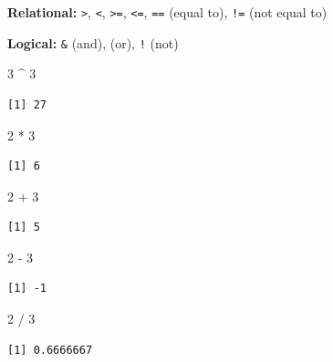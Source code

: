 \documentclass[
  letterpaper,
  DIV=11,
  numbers=noendperiod]{scrartcl}
\newenvironment{Shaded}{\begin{snugshade}}{\end{snugshade}}
\newcommand{\DecValTok}[1]{\textcolor[rgb]{0.68,0.00,0.00}{#1}}
\newcommand{\SpecialCharTok}[1]{\textcolor[rgb]{0.37,0.37,0.37}{#1}}
\begin{document}
\textbf{Relational:} \texttt{\textgreater{}}, \texttt{\textless{}},
\texttt{\textgreater{}=}, \texttt{\textless{}=}, \texttt{==} (equal to),
\texttt{!=} (not equal to)

\textbf{Logical:} \texttt{\&} (and), \texttt{\textbar{}} (or),
\texttt{!} (not)

\begin{Shaded}
\begin{Highlighting}[]
\DecValTok{3} \SpecialCharTok{\^{}} \DecValTok{3}
\end{Highlighting}
\end{Shaded}

\begin{verbatim}
[1] 27
\end{verbatim}

\begin{Shaded}
\begin{Highlighting}[]
\DecValTok{2} \SpecialCharTok{*} \DecValTok{3}
\end{Highlighting}
\end{Shaded}

\begin{verbatim}
[1] 6
\end{verbatim}

\begin{Shaded}
\begin{Highlighting}[]
\DecValTok{2} \SpecialCharTok{+} \DecValTok{3}
\end{Highlighting}
\end{Shaded}

\begin{verbatim}
[1] 5
\end{verbatim}

\begin{Shaded}
\begin{Highlighting}[]
\DecValTok{2} \SpecialCharTok{{-}} \DecValTok{3}
\end{Highlighting}
\end{Shaded}

\begin{verbatim}
[1] -1
\end{verbatim}

\begin{Shaded}
\begin{Highlighting}[]
\DecValTok{2} \SpecialCharTok{/} \DecValTok{3}
\end{Highlighting}
\end{Shaded}

\begin{verbatim}
[1] 0.6666667
\end{verbatim}
\end{document}
